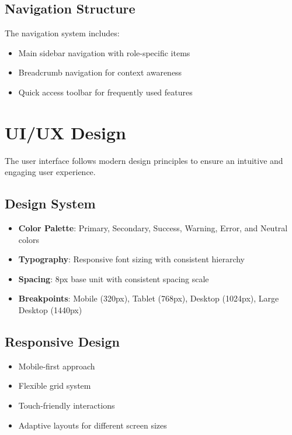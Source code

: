 \subsection{Navigation Structure}

The navigation system includes:

\begin{itemize}
    \item Main sidebar navigation with role-specific items
    \item Breadcrumb navigation for context awareness
    \item Quick access toolbar for frequently used features
\end{itemize}

\section{UI/UX Design}

The user interface follows modern design principles to ensure an intuitive and engaging user experience.

\subsection{Design System}

\begin{itemize}
    \item \textbf{Color Palette}: Primary, Secondary, Success, Warning, Error, and Neutral colors
    \item \textbf{Typography}: Responsive font sizing with consistent hierarchy
    \item \textbf{Spacing}: 8px base unit with consistent spacing scale
    \item \textbf{Breakpoints}: Mobile (320px), Tablet (768px), Desktop (1024px), Large Desktop (1440px)
\end{itemize}

\subsection{Responsive Design}

\begin{itemize}
    \item Mobile-first approach
    \item Flexible grid system
    \item Touch-friendly interactions
    \item Adaptive layouts for different screen sizes
\end{itemize}

